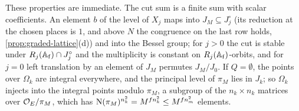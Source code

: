 These properties are immediate. The cut sum is a finite sum with scalar coefficients. An element $b$ of the level of $X_j$ maps into $J_M\subseteq J^\circ_j$ (its reduction at the chosen places is $1$, and above $N$ the congruence on the last row holds, \cref{prop:graded-lattice}(d)) and into the Bessel group; for $j>0$ the cut is stable under
$R_j(\mathbb{A}_{\mathrm f})\cap J^\circ_j$ and the multiplicity is constant on $R_j(\mathbb{A}_{\mathrm f})$-orbits, and for $j=0$ left translation by an element of $J_M$ permutes $J_M/J_0$. If $Q=\emptyset$, the points over $\Omega_k$ are integral everywhere, and the principal level of $\pi_M$ lies in $J_k$; so $\Omega_k$ injects into the integral points
modulo $\pi_M$, a subgroup of the $n_k\times n_k$ matrices over $\mathcal{O}_E/\pi_M$, which has $\operatorname{N}(\pi_M)^{n_k^2}=M^{fn_k^2}\le M^{fn_m^2}$ elements.

